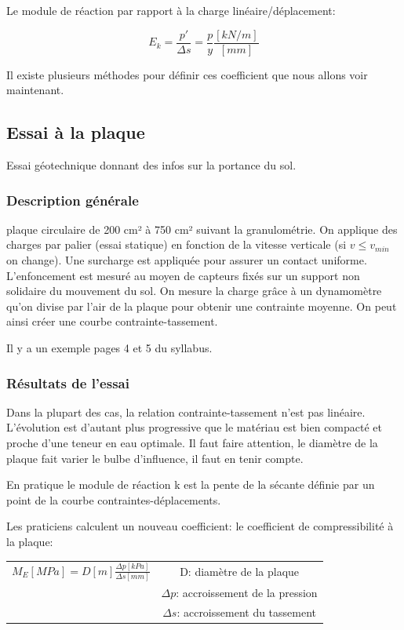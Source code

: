 Le module de réaction par rapport à la charge linéaire/déplacement:

    $$ E_k = \frac{p'}{\Delta s} = \frac{p}{y} \frac{[kN/m]}{[mm]} $$    

Il existe plusieurs méthodes pour définir ces coefficient que nous allons voir maintenant.

\subsection{Essai à la plaque}

Essai géotechnique donnant des infos sur la portance du sol.

\subsubsection{Description générale}

plaque circulaire de 200 cm² à 750 cm² suivant la granulométrie. On applique des charges par palier (essai statique) en fonction de la vitesse verticale (si $v \leq v_{min}$ on change). Une surcharge est appliquée pour assurer un contact uniforme. L'enfoncement est mesuré au moyen de capteurs fixés sur un support non solidaire du mouvement du sol. On mesure la charge grâce à un dynamomètre qu'on divise par l'air de la plaque pour obtenir une contrainte moyenne. On peut ainsi créer une courbe contrainte-tassement.

Il y a un exemple pages 4 et 5 du syllabus.

\subsubsection{Résultats de l'essai}

Dans la plupart des cas, la relation contrainte-tassement n'est pas linéaire. L'évolution est d'autant plus progressive que le matériau est bien compacté et proche d'une teneur en eau optimale. Il faut faire attention, le diamètre de la plaque fait varier le bulbe d'influence, il faut en tenir compte.

En pratique le module de réaction k est la pente de la sécante définie par un point de la courbe contraintes-déplacements.

Les praticiens calculent un nouveau coefficient: le coefficient de compressibilité à la plaque:
\begin{center}
\begin{tabular}{c|c}
$M_E [MPa] = D[m] \frac{\Delta p [kPa]}{\Delta s [mm]}$
                & D: diamètre de la plaque \\
                & $\Delta p$: accroissement de la pression \\
                & $\Delta s$: accroissement du tassement
\end{tabular}
\end{center}

